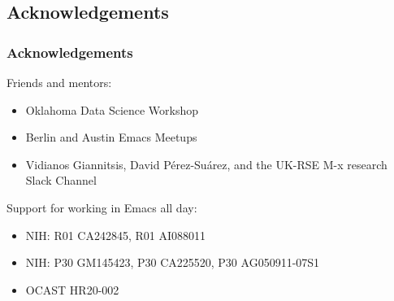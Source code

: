 \documentclass[aspectratio=169]{beamer}
\begin{document}
\subsection{Acknowledgements}
\begin{frame}
\frametitle{Acknowledgements}
\Large{
Friends and mentors:
\begin{itemize}[font=$\bullet$\scshape\bfseries]
\item Oklahoma Data Science Workshop
\item Berlin and Austin Emacs Meetups
\item Vidianos Giannitsis, David Pérez-Suárez, and the UK-RSE M-x research Slack Channel
\end{itemize}
\vspace{0.5cm}
Support for working in Emacs all day:
\begin{itemize}[font=$\bullet$\scshape\bfseries]
    \item NIH: R01 CA242845, R01 AI088011
    \item NIH: P30 GM145423, P30 CA225520, P30 AG050911-07S1 
    \item OCAST HR20-002
\end{itemize}
}
\end{frame}

\end{document}
